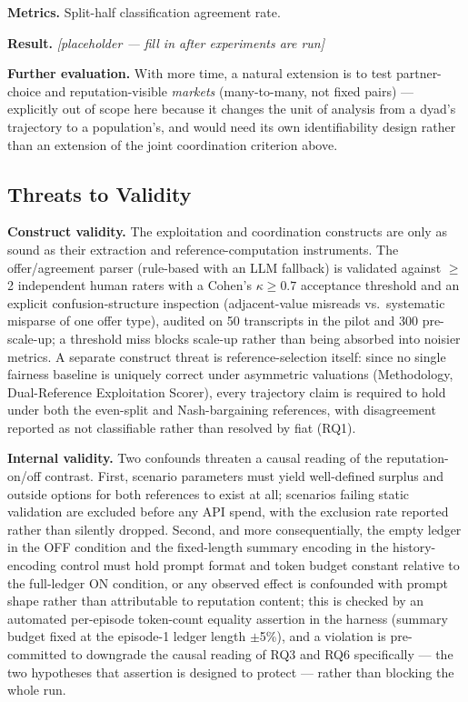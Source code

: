 \documentclass[11pt]{article}
\newcommand{\ph}{\textit{[placeholder --- fill in after experiments are run]}}
\begin{document}
\textbf{Metrics.} Split-half classification agreement rate.

\textbf{Result.} \ph

\vspace{0.5em}
\noindent\textbf{Further evaluation.} With more time, a natural extension is to test partner-choice and reputation-visible \emph{markets} (many-to-many, not fixed pairs) --- explicitly out of scope here because it changes the unit of analysis from a dyad's trajectory to a population's, and would need its own identifiability design rather than an extension of the joint coordination criterion above.

\subsection{Threats to Validity}

\textbf{Construct validity.} The exploitation and coordination constructs are only as sound as their extraction and reference-computation instruments. The offer/agreement parser (rule-based with an LLM fallback) is validated against $\geq$2 independent human raters with a Cohen's $\kappa \geq 0.7$ acceptance threshold and an explicit confusion-structure inspection (adjacent-value misreads vs.\ systematic misparse of one offer type), audited on 50 transcripts in the pilot and 300 pre-scale-up; a threshold miss blocks scale-up rather than being absorbed into noisier metrics. A separate construct threat is reference-selection itself: since no single fairness baseline is uniquely correct under asymmetric valuations (Methodology, Dual-Reference Exploitation Scorer), every trajectory claim is required to hold under both the even-split and Nash-bargaining references, with disagreement reported as not classifiable rather than resolved by fiat (RQ1).

\textbf{Internal validity.} Two confounds threaten a causal reading of the reputation-on/off contrast. First, scenario parameters must yield well-defined surplus and outside options for both references to exist at all; scenarios failing static validation are excluded before any API spend, with the exclusion rate reported rather than silently dropped. Second, and more consequentially, the empty ledger in the OFF condition and the fixed-length summary encoding in the history-encoding control must hold prompt format and token budget constant relative to the full-ledger ON condition, or any observed effect is confounded with prompt shape rather than attributable to reputation content; this is checked by an automated per-episode token-count equality assertion in the harness (summary budget fixed at the episode-1 ledger length $\pm$5\%), and a violation is pre-committed to downgrade the causal reading of RQ3 and RQ6 specifically --- the two hypotheses that assertion is designed to protect --- rather than blocking the whole run.
\end{document}
